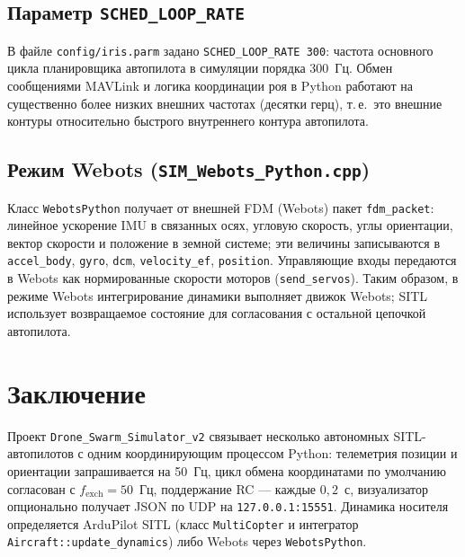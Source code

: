 \documentclass[12pt,a4paper]{article}
\begin{document}
\subsection{Параметр \texttt{SCHED\_LOOP\_RATE}}

В файле \texttt{config/iris.parm} задано \texttt{SCHED\_LOOP\_RATE 300}: частота основного цикла планировщика автопилота в симуляции порядка 300~Гц. Обмен сообщениями MAVLink и логика координации роя в Python работают на существенно более низких внешних частотах (десятки герц), т.\,е.\ это внешние контуры относительно быстрого внутреннего контура автопилота.

\subsection{Режим Webots (\texttt{SIM\_Webots\_Python.cpp})}

Класс \texttt{WebotsPython} получает от внешней FDM (Webots) пакет \texttt{fdm\_packet}: линейное ускорение IMU в связанных осях, угловую скорость, углы ориентации, вектор скорости и положение в земной системе; эти величины записываются в \texttt{accel\_body}, \texttt{gyro}, \texttt{dcm}, \texttt{velocity\_ef}, \texttt{position}. Управляющие входы передаются в Webots как нормированные скорости моторов (\texttt{send\_servos}). Таким образом, в режиме Webots интегрирование динамики выполняет движок Webots; SITL использует возвращаемое состояние для согласования с остальной цепочкой автопилота.

\section{Заключение}

Проект \texttt{Drone\_Swarm\_Simulator\_v2} связывает несколько автономных SITL-автопилотов с одним координирующим процессом Python: телеметрия позиции и ориентации запрашивается на 50~Гц, цикл обмена координатами по умолчанию согласован с $f_{\mathrm{exch}} = 50$~Гц, поддержание RC --- каждые $0{,}2$~с, визуализатор опционально получает JSON по UDP на \texttt{127.0.0.1:15551}. Динамика носителя определяется ArduPilot SITL (класс \texttt{MultiCopter} и интегратор \texttt{Aircraft::update\_dynamics}) либо Webots через \texttt{WebotsPython}.
\end{document}
